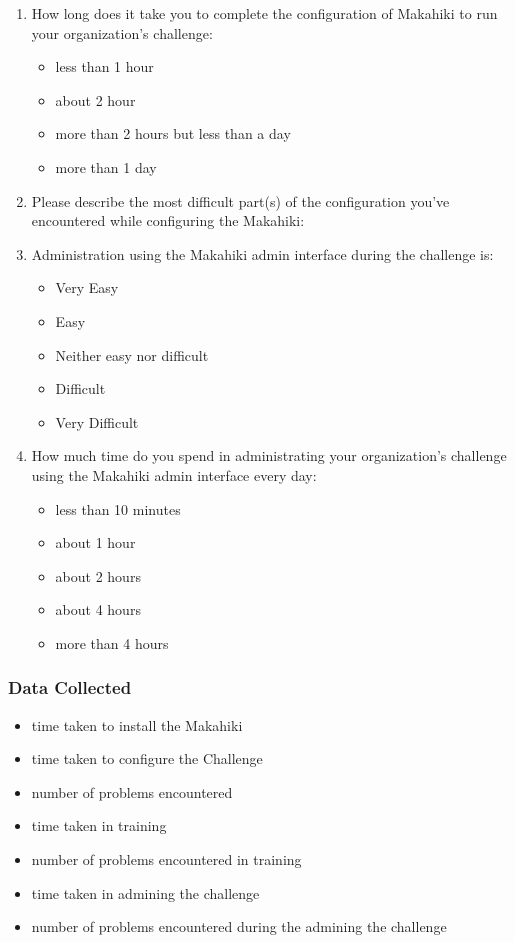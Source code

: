 \documentclass[11pt]{article}
\begin{document}
\begin{enumerate}
\item How long does it take you to complete the configuration of Makahiki to run your organization's challenge: 
\begin{itemize}
\item less than 1 hour
\item about 2 hour
\item more than 2 hours but less than a day
\item more than 1 day
\end{itemize}

\item Please describe the most difficult part(s) of the configuration you've encountered while configuring the Makahiki:

\item Administration using the Makahiki admin interface during the challenge is: 
\begin{itemize}
\item Very Easy
\item Easy
\item Neither easy nor difficult
\item Difficult
\item Very Difficult
\end{itemize}

\item How much time do you spend in administrating your organization's challenge using the Makahiki admin interface every day: 
\begin{itemize}
\item less than 10 minutes
\item about 1 hour
\item about 2 hours
\item about 4 hours
\item more than 4 hours
\end{itemize}

\end{enumerate}

\subsubsection{Data Collected}
\begin{itemize}
 \item time taken to install the Makahiki
 \item time taken to configure the Challenge
 \item number of problems encountered
 \item time taken in training
 \item number of problems encountered in training
 \item time taken in admining the challenge
 \item number of problems encountered during the admining the challenge
 
\end{itemize}
\end{document}
